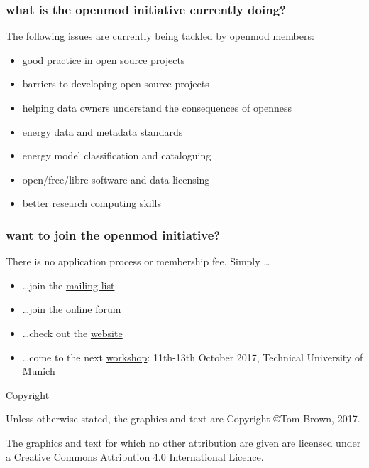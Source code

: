 \documentclass[12pt,aspectratio=169]{beamer}
\let\olditem\item
\renewcommand{\item}{%
\olditem\vspace{5pt}}
\begin{document}
\begin{frame}
  \frametitle{what is the openmod initiative currently doing?}

  The following \alert{issues} are currently being tackled by
  openmod members:
  \begin{itemize}
  \item   good practice in open source projects
  \item barriers to developing open source projects
  \item helping data owners understand the consequences of openness
  \item energy data and metadata standards
  \item energy model classification and cataloguing
  \item open/free/libre software and data licensing
  \item    better research computing skills
  \end{itemize}
\end{frame}

\begin{frame}
  \frametitle{want to join the openmod initiative?}

  There is no application process or membership fee. Simply \dots
  \begin{itemize}
  \item \dots join the \alert{\href{https://groups.google.com/forum/\#!forum/openmod-initiative}{mailing list}}
  \item \dots join the online \alert{\href{https://forum.openmod-initiative.org/}{forum}}
  \item \dots check out the \alert{\href{http://openmod-initiative.org/}{website}}
  \item \dots come to the next \alert{\href{https://wiki.openmod-initiative.org/wiki/Open_Energy_Modelling_Workshop_-_Munich_2017}{workshop}}: 11th-13th October 2017,
    Technical University of Munich
  \end{itemize}

\end{frame}
\begin{frame}{Copyright}


  Unless otherwise stated, the graphics and text are Copyright \copyright Tom Brown, 2017.

  The graphics and text for which no other attribution are given are licensed under a
  \href{http://creativecommons.org/licenses/by/4.0/}{Creative Commons
  Attribution 4.0 International Licence}.

  \begin{center}\ccby\end{center}

\end{frame}
\end{document}
